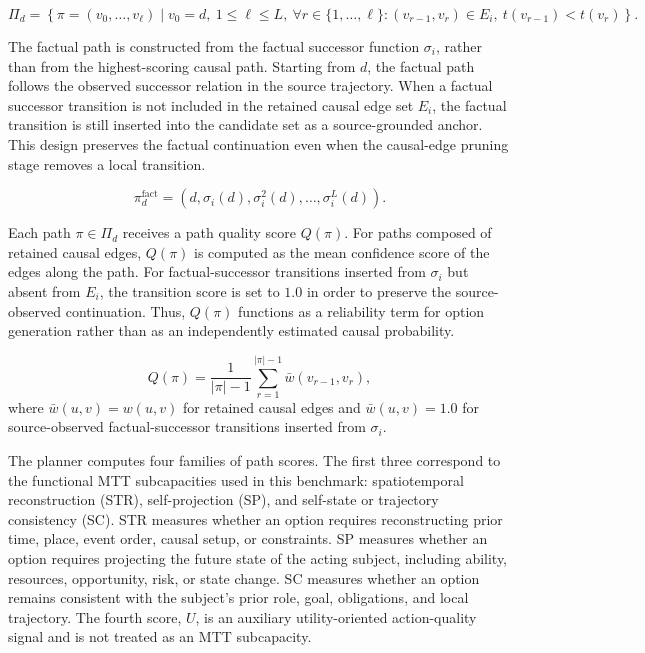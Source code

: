 \documentclass[pdflatex,sn-mathphys-num]{sn-jnl}%
\theoremstyle{thmstyleone}%
\theoremstyle{thmstyletwo}%
\theoremstyle{thmstylethree}%
\begin{document}
\begin{equation}
\Pi_d=\left\{\pi=(v_0,\ldots,v_\ell)\mid v_0=d,\ 1\le \ell\le L,\ \forall r\in\{1,\ldots,\ell\}:(v_{r-1},v_r)\in E_i,\ t(v_{r-1})<t(v_r)\right\}.
\end{equation}

The factual path is constructed from the factual successor function $\sigma_i$, rather than from the highest-scoring causal path. Starting from $d$, the factual path follows the observed successor relation in the source trajectory. When a factual successor transition is not included in the retained causal edge set $E_i$, the factual transition is still inserted into the candidate set as a source-grounded anchor. This design preserves the factual continuation even when the causal-edge pruning stage removes a local transition.

\begin{equation}
\pi_d^{\mathrm{fact}}=(d,\sigma_i(d),\sigma_i^2(d),\ldots,\sigma_i^{L}(d)).
\end{equation}

Each path $\pi\in\Pi_d$ receives a path quality score $Q(\pi)$. For paths composed of retained causal edges, $Q(\pi)$ is computed as the mean confidence score of the edges along the path. For factual-successor transitions inserted from $\sigma_i$ but absent from $E_i$, the transition score is set to $1.0$ in order to preserve the source-observed continuation. Thus, $Q(\pi)$ functions as a reliability term for option generation rather than as an independently estimated causal probability.

\begin{equation}
Q(\pi)=\frac{1}{|\pi|-1}\sum_{r=1}^{|\pi|-1} \bar{w}(v_{r-1},v_r),
\end{equation}
where $\bar{w}(u,v)=w(u,v)$ for retained causal edges and $\bar{w}(u,v)=1.0$ for source-observed factual-successor transitions inserted from $\sigma_i$.

The planner computes four families of path scores. The first three correspond to the functional MTT subcapacities used in this benchmark: spatiotemporal reconstruction (STR), self-projection (SP), and self-state or trajectory consistency (SC). STR measures whether an option requires reconstructing prior time, place, event order, causal setup, or constraints. SP measures whether an option requires projecting the future state of the acting subject, including ability, resources, opportunity, risk, or state change. SC measures whether an option remains consistent with the subject's prior role, goal, obligations, and local trajectory. The fourth score, $U$, is an auxiliary utility-oriented action-quality signal and is not treated as an MTT subcapacity.
\end{document}
